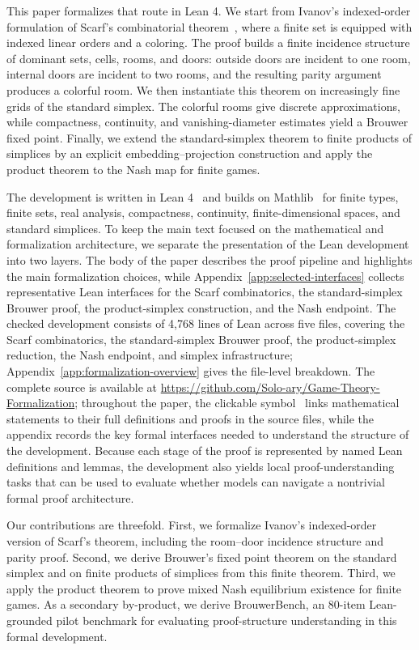 \documentclass{article}
\theoremstyle{definition}
\begin{document}
This paper formalizes that route in Lean 4.  We start from Ivanov's indexed-order formulation of Scarf's combinatorial theorem~\cite{ivanov2019beyond,scarf1982computation}, where a finite set is equipped with indexed linear orders and a coloring.  The proof builds a finite incidence structure of dominant sets, cells, rooms, and doors: outside doors are incident to one room, internal doors are incident to two rooms, and the resulting parity argument produces a colorful room.  We then instantiate this theorem on increasingly fine grids of the standard simplex.  The colorful rooms give discrete approximations, while compactness, continuity, and vanishing-diameter estimates yield a Brouwer fixed point.  Finally, we extend the standard-simplex theorem to finite products of simplices by an explicit embedding--projection construction and apply the product theorem to the Nash map for finite games.

The development is written in Lean 4~\cite{moura2021lean} and builds on Mathlib~\cite{mathlib2020} for finite types, finite sets, real analysis, compactness, continuity, finite-dimensional spaces, and standard simplices.  To keep the main text focused on the mathematical and formalization architecture, we separate the presentation of the Lean development into two layers.  The body of the paper describes the proof pipeline and highlights the main formalization choices, while Appendix~\ref{app:selected-interfaces} collects representative Lean interfaces for the Scarf combinatorics, the standard-simplex Brouwer proof, the product-simplex construction, and the Nash endpoint.  The checked development consists of 4,768 lines of Lean across five files, covering the Scarf combinatorics, the standard-simplex Brouwer proof, the product-simplex reduction, the Nash endpoint, and simplex infrastructure; Appendix~\ref{app:formalization-overview} gives the file-level breakdown.  The complete source is available at \url{https://github.com/Solo-ary/Game-Theory-Formalization}; throughout the paper, the clickable symbol~\faExternalLink*{} links mathematical statements to their full definitions and proofs in the source files, while the appendix records the key formal interfaces needed to understand the structure of the development.  Because each stage of the proof is represented by named Lean definitions and lemmas, the development also yields local proof-understanding tasks that can be used to evaluate whether models can navigate a nontrivial formal proof architecture.

Our contributions are threefold.  First, we formalize Ivanov's indexed-order version of Scarf's theorem, including the room--door incidence structure and parity proof.  Second, we derive Brouwer's fixed point theorem on the standard simplex and on finite products of simplices from this finite theorem.  Third, we apply the product theorem to prove mixed Nash equilibrium existence for finite games.  As a secondary by-product, we derive BrouwerBench, an 80-item Lean-grounded pilot benchmark for evaluating proof-structure understanding in this formal development.
\end{document}
